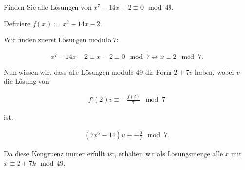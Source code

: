 
\begin{exercise}

Finden Sie alle Lösungen von $x^7 - 14x - 2 \equiv 0 \mod{49}$.

\end{exercise}


\begin{solution}
Definiere $f(x) := x^7 - 14x - 2$.

Wir finden zuerst Lösungen modulo $7$:

\begin{align*}
    x^7 - 14x - 2 \equiv x - 2 \equiv 0 \mod{7} \iff x \equiv 2 \mod{7}.
\end{align*}

Nun wissen wir, dass alle Lösungen modulo 49 die Form $2 + 7v$ haben, wobei
$v$ die Lösung von

\begin{align*}
    f'(2)v \equiv - \frac{f(2)}{7} \mod{7}
\end{align*}

ist.

\begin{align*}
    (7x^6 - 14)v \equiv -\frac{0}{7} \mod{7}.
\end{align*}

Da diese Kongruenz immer erfüllt ist, erhalten wir als Lösungsmenge
alle $x$ mit $x \equiv 2 + 7k \mod{49}$.

\end{solution}

